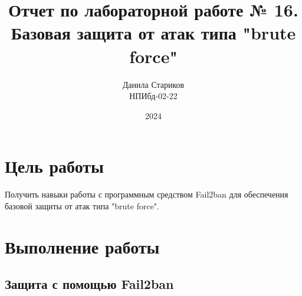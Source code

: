 

\title{Отчет по лабораторной работе № 16. \\ Базовая защита от атак типа "brute force"}
\author{Данила Стариков \\ НПИбд-02-22}
\date{2024}



\maketitle
\newpage

\tableofcontents

\newpage
\section{Цель работы}
Получить навыки работы с программным средством Fail2ban для обеспечения базовой защиты от атак типа "brute force".

\newpage
\section{Выполнение работы}
\subsection{Защита с помощью Fail2ban}

